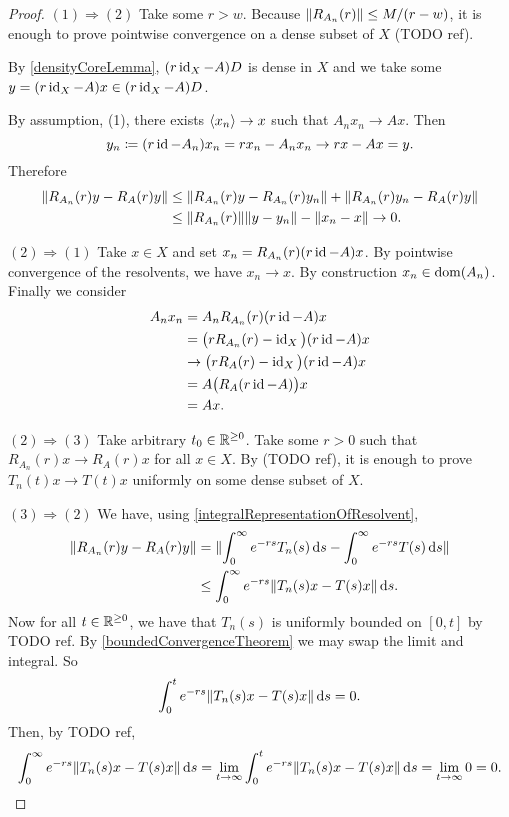 \begin{proof}
$(1) \Rightarrow (2)$ Take some $r > w$. Because $\lVert R_{A_n}(r)\rVert\leq M/(r-w)$, it is enough to prove pointwise convergence on a dense subset of $X$ (TODO ref).

By \ref{densityCoreLemma}, $(r\operatorname{id}_X - A)D$ is dense in $X$ and we take some $y = (r\operatorname{id}_X - A)x\in (r\operatorname{id}_X - A)D$.

By assumption, (1), there exists $\left\langle x_n \right\rangle \to x$ such that $A_nx_n \to Ax$. Then
\[ y_n\coloneqq (r\operatorname{id} - A_n)x_n = r x_n - A_nx_n \to r x - Ax = y. \]
Therefore
\begin{align*}
\lVert R_{A_n}(r)y - R_A(r)y\rVert &\leq \lVert R_{A_n}(r)y - R_{A_n}(r)y_n\rVert + \lVert R_{A_n}(r)y_n - R_A(r)y\rVert \\
&\leq \lVert R_{A_n}(r)\rVert\lVert y-y_n\rVert - \lVert x_n - x\rVert \to 0.
\end{align*}

$(2) \Rightarrow (1)$ Take $x\in X$ and set $x_n = R_{A_n}(r)(r\operatorname{id} - A)x$. By pointwise convergence of the resolvents, we have $x_n\to x$. By construction $x_n\in\operatorname{dom}(A_n)$. Finally we consider
\begin{align*}
A_nx_n &= A_nR_{A_n}(r)(r\operatorname{id} - A)x \\
&= \big(rR_{A_n}(r) - \operatorname{id}_X\big)(r\operatorname{id} - A)x \\
&\to \big(rR_{A}(r) - \operatorname{id}_X\big)(r\operatorname{id} - A)x \\
&= A\big(R_A(r\operatorname{id} - A)\big)x \\
&= Ax.
\end{align*}

$(2) \Rightarrow (3)$ Take arbitrary $t_0\in\mathbb{R}^{\geq 0}$. Take some $r>0$ such that $R_{A_n}(r)x\to R_{A}(r)x$ for all $x\in X$. By (TODO ref), it is enough to prove $T_n(t)x\to T(t)x$ uniformly on some dense subset of $X$. 

$(3) \Rightarrow (2)$ We have, using \ref{integralRepresentationOfResolvent},
\begin{align*}
\lVert R_{A_n}(r)y - R_A(r)y\rVert &= \lVert\int_0^\infty e^{-rs}T_n(s)\operatorname{d \!}{s} - \int_0^\infty e^{-rs}T(s)\operatorname{d \!}{s}\rVert \\
&\leq \int_0^\infty e^{-rs}\lVert T_n(s)x - T(s)x\rVert\operatorname{d \!}{s}.
\end{align*}
Now for all $t\in \mathbb{R}^{\geq 0}$, we have that $T_n(s)$ is uniformly bounded on $[0,t]$ by TODO ref. By \ref{boundedConvergenceTheorem} we may swap the limit and integral. So
\[ \int_0^t e^{-rs}\lVert T_n(s)x - T(s)x\rVert\operatorname{d \!}{s} = 0. \]
Then, by TODO ref,
\[ \int_0^\infty e^{-rs}\lVert T_n(s)x - T(s)x\rVert\operatorname{d \!}{s} = \lim_{t\to \infty}\int_0^t e^{-rs}\lVert T_n(s)x - T(s)x\rVert\operatorname{d \!}{s} = \lim_{t\to \infty}0 = 0. \]
\end{proof}

